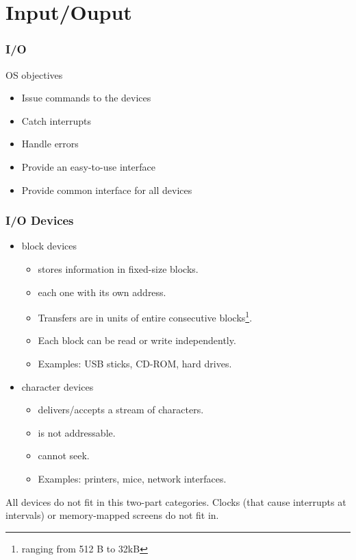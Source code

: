 \section{Input/Ouput}

\begin{frame}
  \frametitle{I/O}
  \begin{block}{OS objectives}
    \begin{itemize}
      \item Issue commands to the devices
      \item Catch interrupts
      \item Handle errors
      \item Provide an easy-to-use interface
      \item Provide common interface for all devices
    \end{itemize}
  \end{block}
\end{frame}

\begin{frame}
  \frametitle{I/O Devices}
  \begin{itemize}
    \item block devices
    \begin{itemize}
      \item stores information in fixed-size blocks.
      \item each one with its own address.
      \item Transfers are in units of entire consecutive blocks\footnote{ranging from 512 B to 32kB}.
      \item Each block can be read or write independently.
      \item Examples: USB sticks, CD-ROM, hard drives.
    \end{itemize}
    \item character devices
    \begin{itemize}
      \item delivers/accepts a stream of characters.
      \item is not addressable.
      \item cannot seek.
      \item Examples: printers, mice, network interfaces.
    \end{itemize}
  \end{itemize}
  All devices do not fit in this two-part categories. Clocks (that cause interrupts at intervals) or memory-mapped screens do not fit in.
\end{frame}

